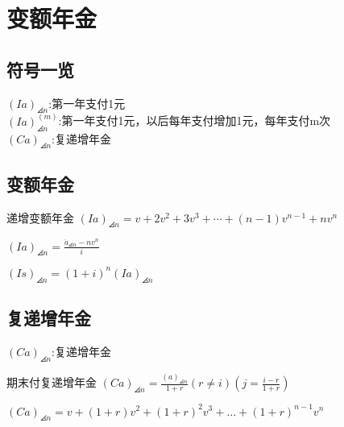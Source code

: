 \chapter{变额年金}
\section{符号一览}
\noindent $(Ia)_{\angles{n}}$:第一年支付1元\\
$(Ia)^{(m)}_{\angles{n}}$:第一年支付1元，以后每年支付增加1元，每年支付m次
\\$(Ca)_{\angles{n}}$:复递增年金
\section{变额年金}
\begin{definition}{递增变额年金}
\noindent $(Ia)_{\angles{n}}=v+2 v^{2}+3 v^{3}+\cdots+(n-1) v^{n-1}+n v^{n}$
\end{definition}
\begin{remark}
	$(Ia)_{\angles{n}}=\frac{\ddot{a}_{\angles{n}}-n v^{n}}{i}$
\end{remark}
\noindent $(Is)_{\angles{n}}=(1+i)^n(Ia)_{\angles{n}}$
\section{复递增年金}
$(Ca)_{\angles{n}}$:复递增年金
\begin{definition}{期末付复递增年金}
\noindent $(Ca)_{\angles{n}}=\frac{(a)_{\angles{n}}}{1+r}(r\neq i)(j=\frac{i-r}{1+r})$
\end{definition}
\begin{remark}
\noindent $(Ca)_{\angles{n}}=v+(1+r)v^2+(1+r)^2v^3+\dots+ (1+r)^{n-1}v^n$
\end{remark}